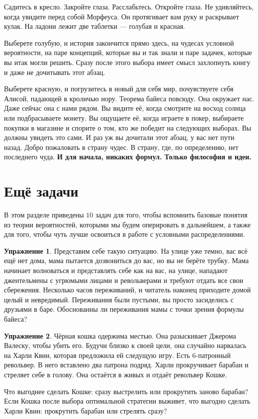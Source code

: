 \documentclass[12pt, a4paper, oneside]{extreport}
\theoremstyle{plain}              %
\theoremstyle{definition}         %
\newtheorem{problem}{\color{myblue} Упражнение}
\begin{document}
Садитесь в кресло. Закройте глаза. Расслабьтесь. Откройте глаза. Не удивляйтесь, когда увидите перед собой Морфеуса. Он протягивает вам руку и раскрывает кулак. На ладони лежит две таблетки --- голубая и красная. 

Выберете голубую, и история закончится прямо здесь, на чудесах условной вероятности, на паре концепций, которые вы и так знали и паре задачек, которые вы итак могли решить. Сразу после этого выбора имеет смысл захлопнуть книгу и даже не дочитывать этот абзац. 

Выберете красную, и погрузитесь в новый для себя мир, почувствуете себя Алисой, падающей в кроличью нору. Теорема байеса повсюду. Она окружает нас. Даже сейчас она с нами рядом. Вы видите её, когда смотрите на восход солнца или подбрасываете монету. Вы ощущаете её, когда играете в покер, выбираете покупки в магазине и спорите о том, кто же победит на следующих выборах. Вы должны увидеть это сами. И раз уж вы дочитали этот абзац, у вас нет пути назад. Добро пожаловать в страну чудес. В страну, где, по определению, нет последнего чуда. \textbf{И для начала, никаких формул. Только философия и идеи.}


\section{Ещё задачи} 

В этом разделе приведены $10$ задач для того, чтобы вспомнить базовые понятия из теории вероятностей, которыми мы будем оперировать в дальнейшем, а также для того, чтобы чуть лучше освоиться в работе с условными распределениями. 

\begin{problem}
Представим себе такую ситуацию. На улице уже темно, вас всё ещё нет дома, мама пытается дозвониться до вас, но вы не берёте трубку.  Мама начинает волноваться и представлять себе как на вас, на улице, нападают джентельмены с угрюмыми лицами и револьверами и требуют отдать все свои сбережения.  Несколько часов переживаний, и читатель наконец приходите домой целый и невредимый. Переживания были пустыми, вы просто засиделись с друзьями в баре.  Обоснованны ли переживания мамы с точки зрения формулы байеса? 
\end{problem}


\begin{problem}
Чёрная кошка одержима местью. Она разыскивает Джерома Валеску, чтобы убить его. Будучи близко к своей цели, она случайно нарвалась на Харли Квин, которая предложила ей следущую игру. Есть 6-патронный  револьвер. В него вставлено два патрона подряд. Харли прокручивает барабан и стреляет себе в голову. Она остаётся в живых и отдаёт револьвер Кошке. 

Что выгоднее сделать Кошке: сразу выстрелить или прокрутить заново барабан? Если Кошка после выбора оптимальной стратегии выживет, что выгодно сделать Харли Квин: прокрутить барабан или стрелять сразу?
\end{problem}
\end{document}
